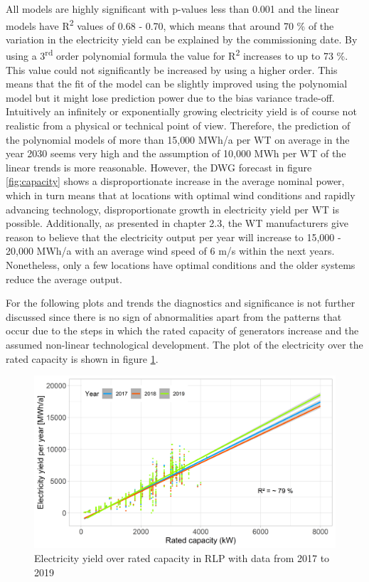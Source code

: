 \documentclass[a4paper,11pt]{article}
\begin{document}
All models are highly significant with p-values less than 0.001 and the linear models have R\textsuperscript{2} values of 0.68 - 0.70, which means that around 70 \% of the variation in the electricity yield can be explained by the commissioning date. By using a 3\textsuperscript{rd} order polynomial formula the value for R\textsuperscript{2} increases to up to 73 \%. This value could not significantly be increased by using a higher order. This means that the fit of the model can be slightly improved using the polynomial model but it might lose prediction power due to the bias variance trade-off. Intuitively an infinitely or exponentially growing electricity yield is of course not realistic from a physical or technical point of view. Therefore, the prediction of the polynomial models of more than 15,000 MWh/a per WT on average in the year 2030 seems very high and the assumption of 10,000 MWh per WT of the linear trends is more reasonable. However, the DWG forecast in figure \ref{fig:capacity} shows a disproportionate increase in the average nominal power, which in turn means that at locations with optimal wind conditions and rapidly advancing technology, disproportionate growth in electricity yield per WT is possible. Additionally, as presented in chapter 2.3, the WT manufacturers give reason to believe that the electricity output per year will increase to 15,000 - 20,000 MWh/a with an average wind speed of 6 m/s within the next years. Nonetheless, only a few locations have optimal conditions and the older systems reduce the average output.

For the following plots and trends the diagnostics and significance is not further discussed since there is no sign of abnormalities apart from the patterns that occur due to the steps in which the rated capacity of generators increase and the assumed non-linear technological development. The plot of the electricity over the rated capacity is shown in figure \ref{fig:eratedcapacity}.
\begin{figure}[H]

{\centering \includegraphics[width=1\linewidth]{data/Amprion/results_of_analysis/electricity_rated_capacity} 

}

\caption{Electricity yield over rated capacity in RLP with data from 2017 to 2019}\label{fig:eratedcapacity}
\end{figure}
\newpage
\end{document}

